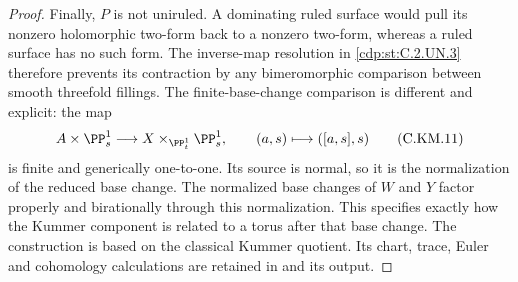 \begin{proof}
Finally, $P$ is not uniruled. A dominating ruled surface
would pull its nonzero holomorphic two-form back to a
nonzero two-form, whereas a ruled surface has no such
form. The inverse-map resolution in \ref{cdp:st:C.2.UN.3} therefore
prevents its contraction by any bimeromorphic comparison
between smooth threefold fillings. The finite-base-change
comparison is different and explicit: the map
\[
 A\times\PP^1_s\longrightarrow
 X\times_{\PP^1_t}\PP^1_s,
         \qquad(a,s)\longmapsto([a,s],s)               \tag{C.KM.11}\label{cdp:eq:C.KM.11}
\]
is finite and generically one-to-one. Its source is
normal, so it is the normalization of the reduced
base change. The normalized base changes of $W$ and
$Y$ factor properly and birationally through this
normalization. This specifies exactly how the Kummer
component is related to a torus after that base change.
The construction is based on the classical Kummer
quotient. Its chart,
trace, Euler and cohomology calculations are retained
in  and its output.
\end{proof}


